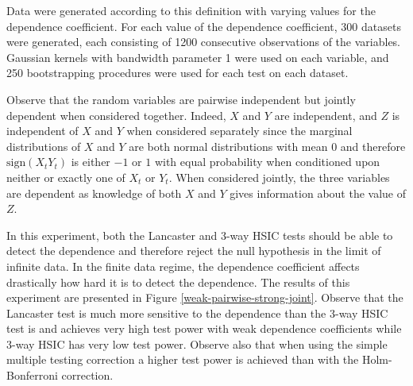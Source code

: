 \documentclass[]{article}
\begin{document}
Data were generated according to this definition with varying values for the dependence coefficient. For each value of the dependence coefficient, 300 datasets were generated, each consisting of 1200 consecutive observations of the variables. Gaussian kernels with bandwidth parameter 1 were used on each variable, and 250 bootstrapping procedures were used for each test on each dataset.

Observe that the random variables are pairwise independent but jointly dependent when considered together. Indeed, $X$ and $Y$ are independent, and $Z$ is independent of $X$ and $Y$ when considered separately since the marginal distributions of $X$ and $Y$ are both normal distributions with mean 0 and therefore $\text{sign}(X_t Y_t)$ is either $-1$ or $1$ with equal probability when conditioned upon neither or exactly one of $X_t$ or $Y_t$. When considered jointly, the three variables are dependent as knowledge of both $X$ and $Y$ gives information about the value of $Z$.

In this experiment, both the Lancaster and 3-way HSIC tests should be able to detect the dependence and therefore reject the null hypothesis in the limit of infinite data. In the finite data regime, the dependence coefficient affects drastically how hard it is to detect the dependence. The results of this experiment are presented in Figure \ref{weak-pairwise-strong-joint}. Observe that the Lancaster test is much more sensitive to the dependence than the 3-way HSIC test is and achieves very high test power with weak dependence coefficients while 3-way HSIC has very low test power. Observe also that when using the simple multiple testing correction a higher test power is achieved than with the Holm-Bonferroni correction.
\end{document}
